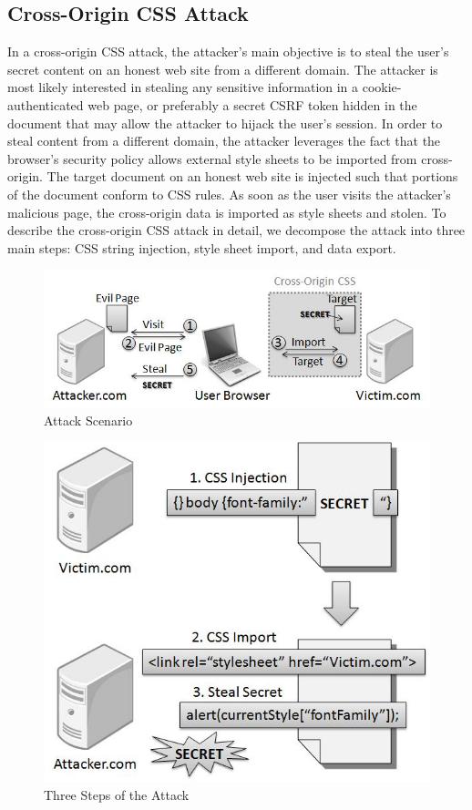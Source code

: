 \documentclass{acm_proc_article-sp}
\begin{document}
{\subsection{Cross-Origin CSS Attack}
In a cross-origin CSS attack, the attacker's main objective is to steal the user's secret content on an honest web site from a different domain. The attacker is most likely interested in stealing any sensitive information in a cookie-authenticated web page, or preferably a secret CSRF token\cite{csrf} hidden in the document that may allow the attacker to hijack the user's session. In order to steal content from a different domain, the attacker leverages the fact that the browser's security policy allows external style sheets to be imported from cross-origin. The target document on an honest web site is injected such that portions of the document conform to CSS rules. As soon as the user visits the attacker's malicious page, the cross-origin data is imported as style sheets and stolen. To describe the cross-origin CSS attack in detail, we decompose the attack into three main steps: CSS string injection, style sheet import, and data export.

\begin{figure}
\centering
\includegraphics[width=\linewidth]{scenario.jpg}
\caption{Attack Scenario}
\end{figure}

\begin{figure}
\centering
\includegraphics[width=\linewidth]{steps.jpg}
\caption{Three Steps of the Attack}
\end{figure}

}
\end{document}
